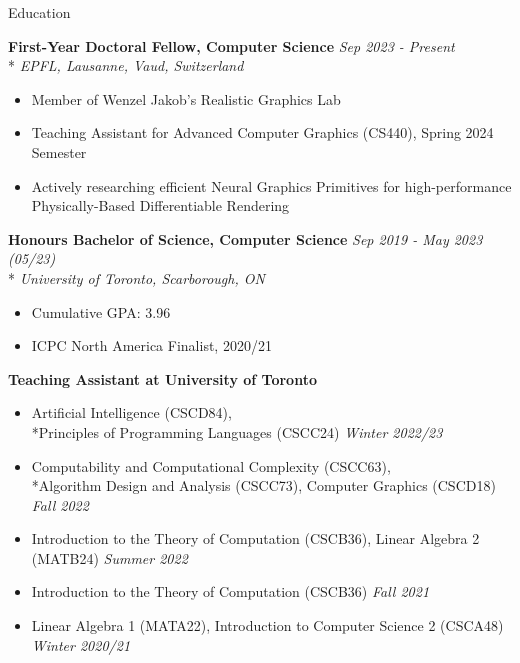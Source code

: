 \documentclass[11pt, letterpaper]{article}
\begin{document}
\begin{section}{Education}

\textbf{First-Year Doctoral Fellow, Computer Science}
\hfill
\textit{Sep 2023 - Present}\\*
\textit{EPFL, Lausanne, Vaud, Switzerland}
\begin{itemize}
  \item Member of Wenzel Jakob's Realistic Graphics Lab
  \item Teaching Assistant for Advanced Computer Graphics (CS440), Spring 2024 Semester
  \item Actively researching efficient Neural Graphics Primitives for high-performance Physically-Based Differentiable Rendering \\
\end{itemize}

\textbf{Honours Bachelor of Science, Computer Science}
\hfill
\textit{Sep 2019 - May 2023 (05/23)}\\*
\textit{University of Toronto, Scarborough, ON}
\begin{itemize}
  \item Cumulative GPA: 3.96
  \item ICPC North America Finalist, 2020/21 \\
\end{itemize}

\textbf{Teaching Assistant at University of Toronto}
\begin{itemize}
  \item Artificial Intelligence (CSCD84), \\*Principles of Programming Languages (CSCC24) \hfill \textit{Winter 2022/23}
  \item Computability and Computational Complexity (CSCC63), \\*Algorithm Design and Analysis (CSCC73), Computer Graphics (CSCD18) \hfill \textit{Fall 2022}
  \item Introduction to the Theory of Computation (CSCB36), Linear Algebra 2 (MATB24) \hfill \textit{Summer 2022}
  \item Introduction to the Theory of Computation (CSCB36) \hfill \textit{Fall 2021}
  \item Linear Algebra 1 (MATA22), Introduction to Computer Science 2 (CSCA48) \hfill \textit{Winter 2020/21}
\end{itemize}

\end{section}
\end{document}
